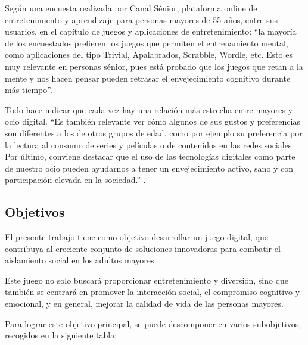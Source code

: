 Según una encuesta realizada por Canal Sénior, plataforma online de entretenimiento y aprendizaje para personas mayores de 55 años, entre sus usuarios, en el capítulo de juegos y aplicaciones de entretenimiento: \enquote{la mayoría de los encuestados prefieren los juegos que permiten el entrenamiento mental, como aplicaciones del tipo Trivial, Apalabrados, Scrabble, Wordle, etc. Esto es muy relevante en personas sénior, pues está probado que los juegos que retan a la mente y nos hacen pensar pueden retrasar el envejecimiento cognitivo durante más tiempo}.

Todo hace indicar que cada vez hay una relación más estrecha entre mayores y ocio digital. \enquote{Es también relevante ver cómo algunos de sus gustos y preferencias son diferentes a los de otros grupos de edad, como por ejemplo su preferencia por la lectura al consumo de series y películas o de contenidos en las redes sociales. Por último, conviene destacar que el uso de las tecnologías digitales como parte de nuestro ocio pueden ayudarnos a tener un envejecimiento activo, sano y con participación elevada en la sociedad.} \parencite{intro6}.

\subsection{Objetivos}
El presente trabajo tiene como objetivo desarrollar un juego digital, que contribuya al creciente conjunto de soluciones innovadoras para combatir el aislamiento social en los adultos mayores.

Este juego no solo buscará proporcionar entretenimiento y diversión, sino que también se centrará en promover la interacción social, el compromiso cognitivo y emocional, y en general, mejorar la calidad de vida de las personas mayores. 

Para lograr este objetivo principal, se puede descomponer en varios subobjetivos, recogidos en la siguiente tabla:

